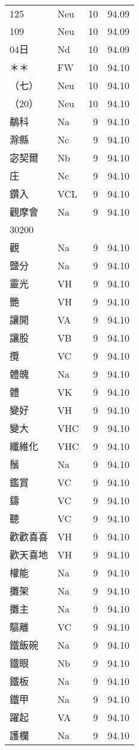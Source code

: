 \documentclass[twocolumn]{book}
\begin{document}
\begin{supertabular}{llrr}
125 & Neu & 10 &  94.09\\
109 & Neu & 10 &  94.09\\
04日 & Nd & 10 &  94.09\\
＊＊ & FW & 10 &  94.10\\
（七） & Neu & 10 &  94.10\\
（20） & Neu & 10 &  94.10\\
鷸科 & Na & 9 &  94.10\\
滁縣 & Nc & 9 &  94.10\\
宓契爾 & Nb & 9 &  94.10\\
庄 & Nc & 9 &  94.10\\
鑽入 & VCL & 9 &  94.10\\
觀摩會 & Na & 9 &  94.10\\
30200\\
觀 & Na & 9 &  94.10\\
鹽分 & Na & 9 &  94.10\\
靈光 & VH & 9 &  94.10\\
艷 & VH & 9 &  94.10\\
讓開 & VA & 9 &  94.10\\
讓股 & VB & 9 &  94.10\\
攬 & VC & 9 &  94.10\\
體魄 & Na & 9 &  94.10\\
體 & VK & 9 &  94.10\\
變好 & VH & 9 &  94.10\\
變大 & VHC & 9 &  94.10\\
纖維化 & VHC & 9 &  94.10\\
鬚 & Na & 9 &  94.10\\
鑑賞 & VC & 9 &  94.10\\
鑄 & VC & 9 &  94.10\\
聽 & VC & 9 &  94.10\\
歡歡喜喜 & VH & 9 &  94.10\\
歡天喜地 & VH & 9 &  94.10\\
權能 & Na & 9 &  94.10\\
攤架 & Na & 9 &  94.10\\
攤主 & Na & 9 &  94.10\\
驅離 & VC & 9 &  94.10\\
鐵飯碗 & Na & 9 &  94.10\\
鐵眼 & Nb & 9 &  94.10\\
鐵板 & Na & 9 &  94.10\\
鐵甲 & Na & 9 &  94.10\\
躍起 & VA & 9 &  94.10\\
護欄 & Na & 9 &  94.10\\

\end{supertabular}
\end{document}
